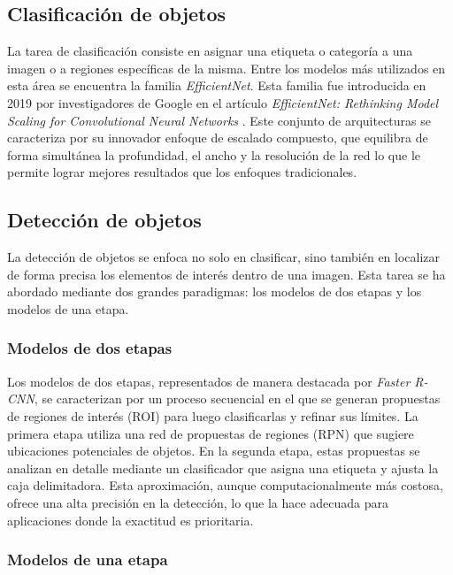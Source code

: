 \subsection{Clasificación de objetos}

La tarea de clasificación consiste en asignar una etiqueta o categoría a una imagen o a regiones específicas de la misma. Entre los modelos más utilizados en esta área se encuentra la familia \textit{EfficientNet}. Esta familia fue introducida en 2019 por investigadores de Google en el artículo \textit{EfficientNet: Rethinking Model Scaling for Convolutional Neural Networks} \citep{tan_efficientnet_2020}. Este conjunto de arquitecturas se caracteriza por su innovador enfoque de escalado compuesto, que equilibra de forma simultánea la profundidad, el ancho y la resolución de la red lo que le permite lograr mejores resultados que los enfoques tradicionales.

\subsection{Detección de objetos}

La detección de objetos se enfoca no solo en clasificar, sino también en localizar de forma precisa los elementos de interés dentro de una imagen. Esta tarea se ha abordado mediante dos grandes paradigmas: los modelos de dos etapas y los modelos de una etapa.

\subsubsection{Modelos de dos etapas}

Los modelos de dos etapas, representados de manera destacada por \textit{Faster R-CNN}, se caracterizan por un proceso secuencial en el que se generan propuestas de regiones de interés (ROI) para luego clasificarlas y refinar sus límites. La primera etapa utiliza una red de propuestas de regiones (RPN) que sugiere ubicaciones potenciales de objetos. En la segunda etapa, estas propuestas se analizan en detalle mediante un clasificador que asigna una etiqueta y ajusta la caja delimitadora. Esta aproximación, aunque computacionalmente más costosa, ofrece una alta precisión en la detección, lo que la hace adecuada para aplicaciones donde la exactitud es prioritaria.

\subsubsection{Modelos de una etapa}


